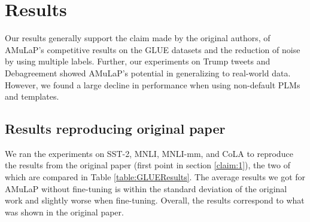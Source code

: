 \section{Results}
\label{sec:results}

Our results generally support the claim made by the original authors, of AMuLaP's competitive results on the GLUE datasets and the reduction of noise by using multiple labels. Further, our experiments on Trump tweets and Debagreement showed AMuLaP's potential in generalizing to real-world data. However, we found a large decline in performance when using non-default PLMs and templates.

\subsection{Results reproducing original paper}



We ran the experiments on SST-2, MNLI, MNLI-mm, and CoLA to reproduce the results from the original paper (first point in section \ref{claim:1}), the two of which are compared in Table \ref{table:GLUEResults}. The average results we got for AMuLaP without fine-tuning is within the standard deviation of the original work and slightly worse when fine-tuning. Overall, the results correspond to what was shown in the original paper.


